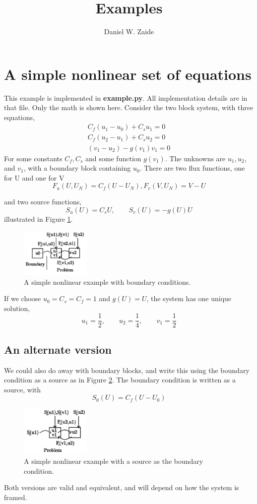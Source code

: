 \documentclass[11pt]{article}
\title{Examples}
\author{Daniel W. Zaide}
\begin{document}
\maketitle
\section{A simple nonlinear set of equations}
This example is implemented in {\bf example.py}. All implementation details are in that file. Only the math is shown here. Consider the two block system, with three equations,
\begin{eqnarray*}
C_f(u_1 - u_0) + C_su_1 = 0 \\ C_f(u_2 - u_1) + C_su_2 = 0 \\ (v_1-u_2) - g(v_1)v_1 = 0
\end{eqnarray*}
For some constants $C_f, C_s$ and some function $g(v_1)$. The unknowns are $u_1,u_2$, and $v_1$, with a boundary block containing $u_0$. There are two flux functions, one for U and one for V
\[
F_u(U,U_N) = C_f(U-U_N), F_v(V,U_N) = V-U
\]

and two source functions,
\[
S_u(U) = C_sU, \qquad S_v(U) = -g(U)U
\]
illustrated in Figure \ref{fig:ex1}.
\begin{figure}[!ht]
\centering
\includegraphics[width=0.3\textwidth]{images/example1.png}
\caption{A simple nonlinear example with boundary conditions.}
\label{fig:ex1}
\end{figure}


If we choose $u_0 = C_s = C_f = 1$ and $g(U) = U$, the system has one unique solution,
\[
u_1 = \frac{1}{2}, \qquad u_2 = \frac{1}{4}, \qquad v_1 = \frac{1}{2}
\]


\subsection{An alternate version}
We could also do away with boundary blocks, and write this using the boundary condition as a source as in Figure \ref{fig:ex2}. The boundary condition is written as a source, with
\[
S_0(U) = C_f(U-U_0)
\]
\begin{figure}[!ht]
\centering
\includegraphics[width=0.3\textwidth]{images/example1a.png}
\caption{A simple nonlinear example with a source as the boundary condition.}
\label{fig:ex2}
\end{figure}
Both versions are valid and equivalent, and will depend on how the system is framed.
\end{document}
